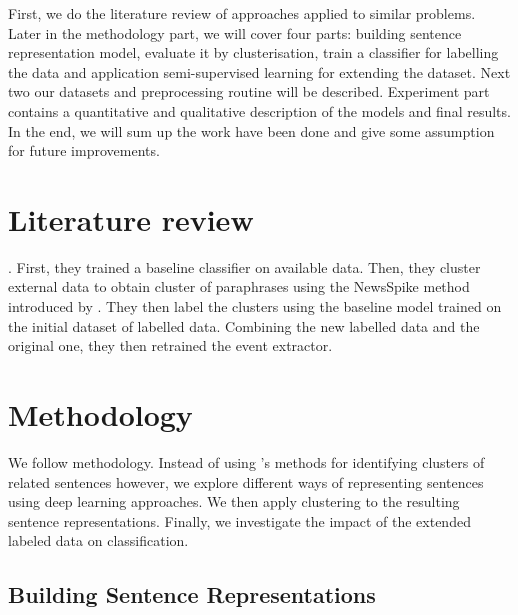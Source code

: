 \documentclass[11pt]{article}
\begin{document}
First, we do the literature review of approaches applied to similar problems. Later in the methodology part, we will cover four parts: building sentence representation model, evaluate it by clusterisation, train a classifier for labelling the data and application semi-supervised learning for extending the dataset. Next two our datasets and preprocessing routine will be described. Experiment part contains a quantitative and qualitative description of the models and final results. In the end, we will sum up the work have been done and give some assumption for future improvements.

\section{Literature review}

\cite{N18-2058} . First, they trained a baseline classifier on available data. Then, they cluster external data to obtain cluster of paraphrases using the NewsSpike method introduced by \cite{zhang2015}. They then label the clusters using the baseline model trained on the initial dataset of labelled data. Combining the new labelled data and the original one, they then retrained the event extractor.

\section{Methodology}

We follow \cite{N18-2058} methodology. Instead of using \cite{zhang2015}'s methods for identifying clusters of related sentences however, we explore different ways of representing sentences using deep learning approaches. We then apply clustering to the resulting sentence representations. Finally, we investigate the impact of the extended labeled data on classification. 





\subsection{Building Sentence Representations}
\end{document}
